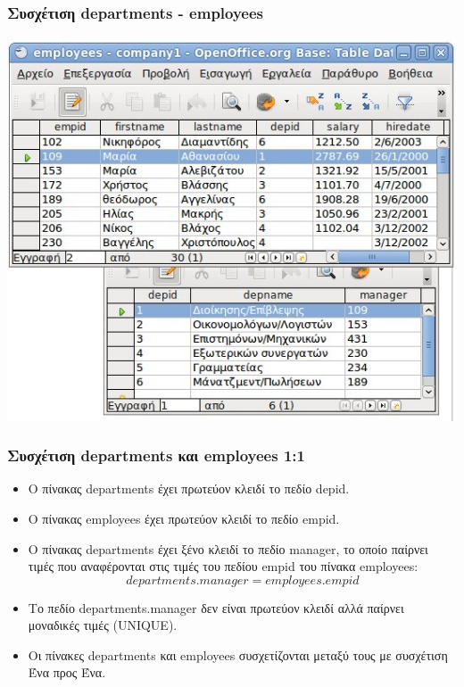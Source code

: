 \begin{frame}
\frametitle{Συσχέτιση {\en departments - employees} }
\includegraphics[scale=0.65]{company1-relationship.jpg} \\
\bigskip
\begin{minipage}{\wE}

\end{minipage}
\end{frame}

\begin{frame}
\frametitle{Συσχέτιση {\en departments} και {\en employees} 1:1}
\begin{itemize}
  \item Ο πίνακας {\ra departments} έχει {\cee πρωτεύον κλειδί} το πεδίο {\ra depid}.
  \item Ο πίνακας {\ra employees} έχει {\cee πρωτεύον κλειδί} το πεδίο {\ra empid}.
  \item Ο πίνακας {\ra departments} έχει {\cee ξένο κλειδί} το πεδίο {\ra manager},
        το οποίο παίρνει τιμές που {\bbl αναφέρονται} στις τιμές του πεδίου
        {\ra empid} του πίνακα {\ra employees}:
        \[ departments.manager = employees.empid \]
\end{itemize}
\pause
\begin{minipage}{\wE}
\begin{itemize} 
  \item Το πεδίο {\ra departments.manager}  {\cee δεν είναι πρωτεύον κλειδί}
        αλλά παίρνει μοναδικές τιμές ({\sq UNIQUE}).
  \item Οι πίνακες {\ra departments} και {\ra employees}  συσχετίζονται μεταξύ τους
        με συσχέτιση {\cee  Ένα προς Ένα}.
\end{itemize}
\end{minipage}
\end{frame}





